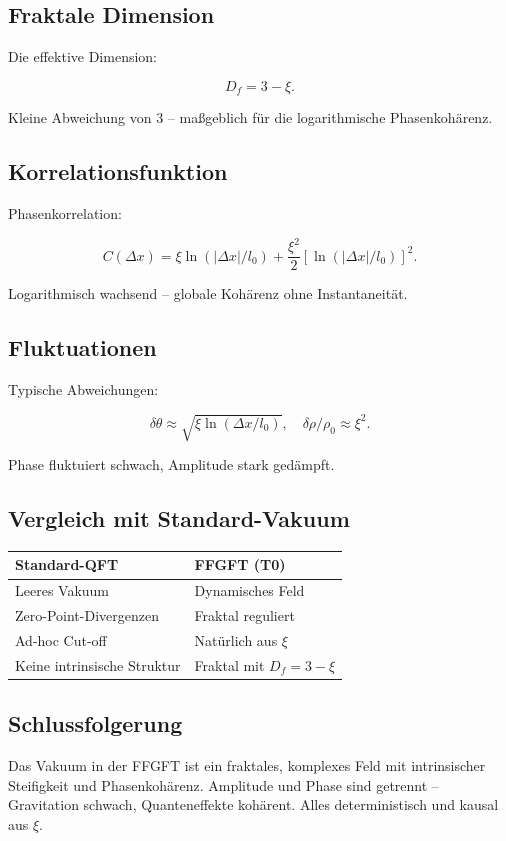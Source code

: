 	\subsection*{Fraktale Dimension}
	
	Die effektive Dimension:
	
	\begin{equation}
		D_f = 3 - \xi.
	\end{equation}
	
	Kleine Abweichung von 3 – maßgeblich für die logarithmische Phasenkohärenz.
	
	\subsection*{Korrelationsfunktion}
	
	Phasenkorrelation:
	
	\begin{equation}
		C(\Delta x) = \xi \ln(|\Delta x|/l_0) + \frac{\xi^2}{2} [\ln(|\Delta x|/l_0)]^2.
	\end{equation}
	
	Logarithmisch wachsend – globale Kohärenz ohne Instantaneität.
	
	\subsection*{Fluktuationen}
	
	Typische Abweichungen:
	
	\begin{equation}
		\delta \theta \approx \sqrt{\xi \ln(\Delta x / l_0)}, \quad \delta \rho / \rho_0 \approx \xi^2.
	\end{equation}
	
	Phase fluktuiert schwach, Amplitude stark gedämpft.
	
	\subsection*{Vergleich mit Standard-Vakuum}
	
	\begin{center}
		\begin{tabular}{p{}p{}}
			\textbf{Standard-QFT} & \textbf{FFGFT (T0)} \\
			\hline
			Leeres Vakuum & Dynamisches Feld \\
			Zero-Point-Divergenzen & Fraktal reguliert \\
			Ad-hoc Cut-off & Natürlich aus \(\xi\) \\
			Keine intrinsische Struktur & Fraktal mit \(D_f = 3 - \xi\) \\
		\end{tabular}
	\end{center}
	
	\subsection*{Schlussfolgerung}
	
	Das Vakuum in der FFGFT ist ein fraktales, komplexes Feld mit intrinsischer Steifigkeit und Phasenkohärenz. Amplitude und Phase sind getrennt – Gravitation schwach, Quanteneffekte kohärent. Alles deterministisch und kausal aus \(\xi\).




